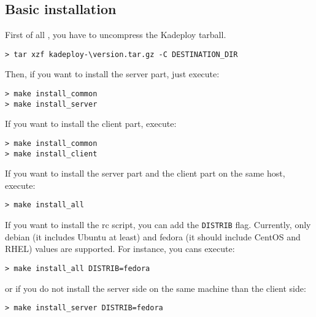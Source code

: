 \documentclass[a4wide,10pt,oneside]{book}
\newcommand{\version}{3.0-5}
\begin{document}
\subsection{Basic installation}
First of all , you have to uncompress the Kadeploy tarball.
\begin{small}
\begin{Verbatim}[commandchars=\\\{\}]
> tar xzf kadeploy-\version.tar.gz -C DESTINATION_DIR
\end{Verbatim}
\end{small}

\noindent Then, if you want to install the server part, just execute:
\begin{small}
\begin{verbatim}
> make install_common
> make install_server
\end{verbatim}
\end{small}

\noindent If you want to install the client part, execute:
\begin{small}
\begin{verbatim}
> make install_common
> make install_client
\end{verbatim}
\end{small}

\noindent If you want to install the server part and the client part on the same host, execute:
\begin{small}
\begin{verbatim}
> make install_all
\end{verbatim}
\end{small}

\noindent If you want to install the rc script, you can add the \texttt{DISTRIB} flag. Currently, only debian (it includes Ubuntu at least) and fedora (it should include CentOS and RHEL) values are supported. For instance, you cans execute:
\begin{small}
\begin{verbatim}
> make install_all DISTRIB=fedora
\end{verbatim}
\end{small}
or if you do not install the server side on the same machine than the client side:
\begin{small}
\begin{verbatim}
> make install_server DISTRIB=fedora
\end{verbatim}
\end{small}
\end{document}
